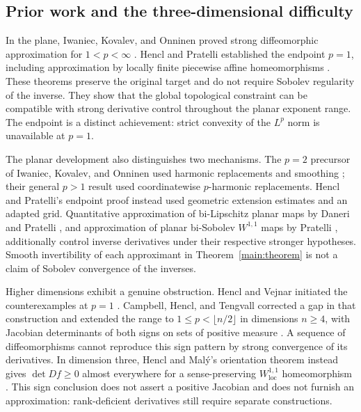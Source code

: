 \subsection{Prior work and the three-dimensional difficulty}

In the plane, Iwaniec, Kovalev, and Onninen proved strong diffeomorphic
approximation for $1<p<\infty$
\cite[Theorem~1.1]{IwaniecKovalevOnninen2011}. Hencl and Pratelli
established the endpoint $p=1$, including approximation by locally
finite piecewise affine homeomorphisms
\cite[Theorem~1.1]{HenclPratelli2018}. These theorems preserve the
original target and do not require Sobolev regularity of the inverse.
They show that the global topological constraint can be compatible
with strong derivative control throughout the planar exponent range.
The endpoint is a distinct achievement: strict convexity of the
$L^p$ norm is unavailable at $p=1$.

The planar development also distinguishes two mechanisms. The
$p=2$ precursor of Iwaniec, Kovalev, and Onninen used harmonic
replacements and smoothing \cite{IwaniecKovalevOnninen2012}; their
general $p>1$ result used coordinatewise $p$-harmonic replacements.
Hencl and Pratelli's endpoint proof instead used geometric extension
estimates and an adapted grid. Quantitative approximation of
bi-Lipschitz planar maps by Daneri and Pratelli
\cite{DaneriPratelli2014}, and approximation of planar bi-Sobolev
$W^{1,1}$ maps by Pratelli \cite{Pratelli2017}, additionally control
inverse derivatives under their respective stronger hypotheses.
Smooth invertibility of each approximant in Theorem~\ref{main:theorem}
is not a claim of Sobolev convergence of the inverses.

Higher dimensions exhibit a genuine obstruction. Hencl and Vejnar
initiated the counterexamples at $p=1$ \cite{HenclVejnar2016}.
Campbell, Hencl, and Tengvall corrected a gap in that construction and
extended the range to $1\le p<\lfloor n/2\rfloor$ in dimensions
$n\ge4$, with Jacobian determinants of both signs on sets of positive
measure \cite{CampbellHenclTengvall2018}. A sequence of diffeomorphisms cannot
reproduce this sign pattern by strong convergence of its derivatives.
In dimension three, Hencl and Mal\'y's orientation theorem instead
gives $\det Df\ge0$ almost everywhere for a sense-preserving
$W^{1,1}_{\mathrm{loc}}$ homeomorphism
\cite[Theorem~1.1]{HenclMaly2010}. This sign conclusion does not
assert a positive Jacobian and does not furnish an approximation:
rank-deficient derivatives still require separate constructions.

